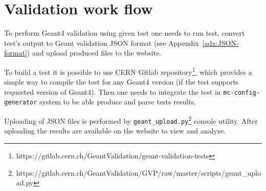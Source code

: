 \section{Validation work flow}
\label{sec-workflow}

To perform Geant4 validation using given test one needs to run test, convert test's output to Geant validation JSON format (see Appendix~\ref{adx:JSON-format}) and upload produced files to the website.

To build a test it is possible to use CERN Gitlab repository\footnote{https://gitlab.cern.ch/GeantValidation/geant-validation-tests}, which provides a simple way to compile the test for any Geant4 version (if the test supports requested version of Geant4).
Then one needs to integrate the test in {\tt mc-config-generator} system to be able produce and parse tests results.

Uploading of JSON files is performed by {\tt geant\_upload.py}\footnote{https://gitlab.cern.ch/GeantValidation/GVP/raw/master/scripts/geant\_upload.py} console utility.
After uploading the results are available on the website to view and analyze.